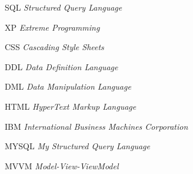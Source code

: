 \begin{siglas}
  \item[SQL] \textit{Structured Query Language}
  \item[XP] \textit{Extreme Programming}
  \item[CSS] \textit{Cascading Style Sheets}
  \item[DDL] \textit{Data Definition Language}
  \item[DML] \textit{Data Manipulation Language}
  \item[HTML] \textit{HyperText Markup Language}
  \item[IBM] \textit{International Business Machines Corporation}
  \item[MYSQL] \textit{My Structured Query Language}
  \item[MVVM] \textit{Model-View-ViewModel}
\end{siglas}